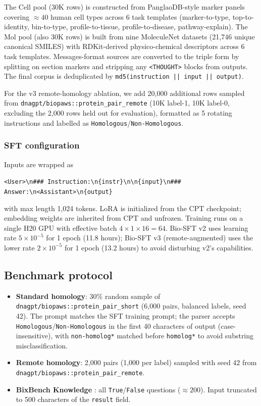 \documentclass[11pt]{article}
\begin{document}
The Cell pool (30K rows) is constructed from PanglaoDB-style \citep{franzen2019panglaodb} marker panels covering $\approx 40$ human cell types across 6 task templates (marker-to-type, top-to-identity, bin-to-type, profile-to-tissue, profile-to-disease, pathway-explain). The Mol pool (also 30K rows) is built from nine MoleculeNet \citep{wu2018moleculenet} datasets (21{,}746 unique canonical SMILES) with RDKit-derived physico-chemical descriptors across 6 task templates. Messages-format sources are converted to the triple form by splitting on section markers and stripping any \texttt{<THOUGHT>} blocks from outputs. The final corpus is deduplicated by \texttt{md5(instruction || input || output)}.

For the v3 remote-homology ablation, we add 20{,}000 additional rows sampled from \texttt{dnagpt/biopaws::protein\_pair\_remote} (10K label-1, 10K label-0, excluding the 2{,}000 rows held out for evaluation), formatted as 5 rotating instructions and labelled as \texttt{Homologous}/\texttt{Non-Homologous}.

\subsubsection{SFT configuration}

Inputs are wrapped as
\begin{center}
\texttt{<User>\textbackslash n\#\#\# Instruction:\textbackslash n\{instr\}\textbackslash n\textbackslash n\{input\}\textbackslash n\#\#\# Answer:\textbackslash n<Assistant>\textbackslash n\{output\}}
\end{center}
with max length 1{,}024 tokens. LoRA is initialized from the CPT checkpoint; embedding weights are inherited from CPT and unfrozen. Training runs on a single H20 GPU with effective batch $4 \times 1 \times 16 = 64$. Bio-SFT v2 uses learning rate $5 \times 10^{-5}$ for 1 epoch (11.8 hours); Bio-SFT v3 (remote-augmented) uses the lower rate $2 \times 10^{-5}$ for 1 epoch (13.2 hours) to avoid disturbing v2's capabilities.

\subsection{Benchmark protocol}

\begin{itemize}\setlength\itemsep{0pt}
\item \textbf{Standard homology}: 30\% random sample of \texttt{dnagpt/biopaws::protein\_pair\_short} (6{,}000 pairs, balanced labels, seed 42). The prompt matches the SFT training prompt; the parser accepts \texttt{Homologous}/\texttt{Non-Homologous} in the first 40 characters of output (case-insensitive), with \texttt{non-homolog*} matched before \texttt{homolog*} to avoid substring misclassification.
\item \textbf{Remote homology}: 2{,}000 pairs (1{,}000 per label) sampled with seed 42 from \texttt{dnagpt/biopaws::protein\_pair\_remote}.
\item \textbf{BixBench Knowledge} \citep{bixbench2024}: all \texttt{True}/\texttt{False} questions ($\approx 200$). Input truncated to 500 characters of the \texttt{result} field.
\end{itemize}
\end{document}
